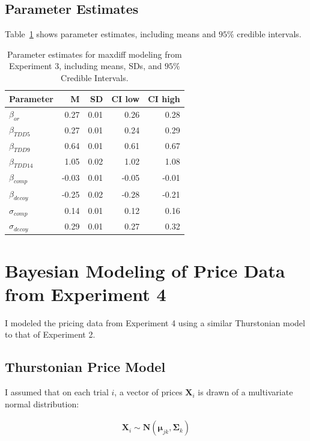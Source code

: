 \section{Parameter Estimates}
Table~\ref{tab:maxdiff_params} shows parameter estimates, including means and $95\%$ credible intervals. 
\begin{table}[ht]
    \centering
    \begin{tabular}{lrrrr}
        \toprule
        Parameter & M & SD & CI low & CI high \\
        \midrule
        $\beta_{or}$ & 0.27 & 0.01 & 0.26 & 0.28\\
        $\beta_{TDD5}$ & 0.27 & 0.01 & 0.24 & 0.29\\
        $\beta_{TDD9}$ & 0.64 & 0.01 & 0.61 & 0.67\\
        $\beta_{TDD14}$ & 1.05 & 0.02 & 1.02 & 1.08\\
        $\beta_{comp}$ & -0.03 & 0.01 & -0.05 & -0.01\\
        $\beta_{decoy}$ & -0.25 & 0.02 & -0.28 & -0.21\\
        $\sigma_{comp}$ & 0.14 & 0.01 & 0.12 & 0.16 \\
        $\sigma_{decoy}$ & 0.29 & 0.01 & 0.27 & 0.32 \\
        \bottomrule 
    \end{tabular}
    \caption{Parameter estimates for maxdiff modeling from Experiment 3, including means, SDs, and $95\%$ Credible Intervals.}
    \label{tab:maxdiff_params}
 \end{table}

\chapter{Bayesian Modeling of Price Data from Experiment 4}

I modeled the pricing data from Experiment 4 using a similar Thurstonian model to that of Experiment 2.

\section{Thurstonian Price Model}

I assumed that on each trial $i$, a vector of prices $\textbf{X}_{i}$ is drawn of a multivariate normal distribution:

\begin{align}
    \textbf{X}_{i}\sim \mathcal{\textbf{N}}(\boldsymbol{\mu}_{jk},\boldsymbol{\Sigma}_{k})
\end{align}

